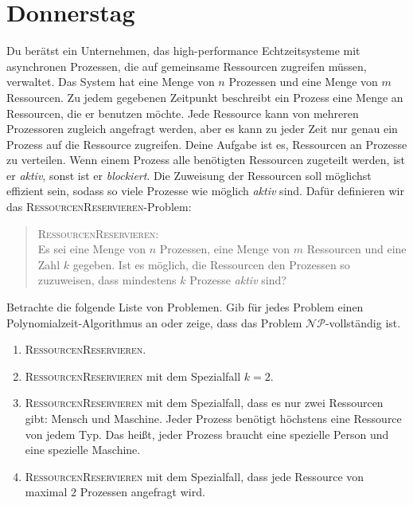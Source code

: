 \documentclass{uebung_cs}
\begin{document}
\section*{Donnerstag}

\begin{aufgabe}[Ressourcenmanagement]
	 Du berätst ein Unternehmen, das high-performance Echtzeitsysteme mit asynchronen Prozessen, die auf gemeinsame Ressourcen zugreifen müssen, verwaltet. Das System hat eine Menge von $n$ Prozessen und eine Menge von $m$ Ressourcen. Zu jedem gegebenen Zeitpunkt beschreibt ein Prozess eine Menge an Ressourcen, die er benutzen möchte. Jede Ressource kann von mehreren Prozessoren zugleich angefragt werden, aber es kann zu jeder Zeit nur genau ein Prozess auf die Ressource zugreifen. Deine Aufgabe ist es, Ressourcen an Prozesse zu verteilen. Wenn einem Prozess alle benötigten Ressourcen zugeteilt werden, ist er \textit{aktiv}, sonst ist er \textit{blockiert}. Die Zuweisung der Ressourcen soll möglichst effizient sein, sodass so viele Prozesse wie möglich \textit{aktiv} sind. Dafür definieren wir das \textsc{RessourcenReservieren}-Problem:
	 \begin{quote}
	 \textsc{RessourcenReservieren}:\\
	 Es sei eine Menge von $n$ Prozessen, eine Menge von $m$ Ressourcen und eine Zahl $k$ gegeben. Ist es möglich, die Ressourcen den Prozessen so zuzuweisen, dass mindestens $k$ Prozesse \textit{aktiv} sind?
	 \end{quote}
	 
	 Betrachte die folgende Liste von Problemen. Gib für jedes Problem einen Polynomialzeit-Algorithmus an oder zeige, dass das Problem $\mathcal{NP}$-vollständig ist.
	 \begin{enumerate}
	 	\item \textsc{RessourcenReservieren}. \\
	 	\item \textsc{RessourcenReservieren} mit dem Spezialfall $k=2$.\\
	 	\item \textsc{RessourcenReservieren} mit dem Spezialfall, dass es nur zwei Ressourcen gibt: Mensch und Maschine. Jeder Prozess benötigt höchstens eine Ressource von jedem Typ. Das heißt, jeder Prozess braucht eine spezielle Person und eine spezielle Maschine.\\
	 	\item \textsc{RessourcenReservieren} mit dem Spezialfall, dass jede Ressource von maximal $2$ Prozessen angefragt wird.	 	
	 \end{enumerate}
\end{aufgabe}
\end{document}
